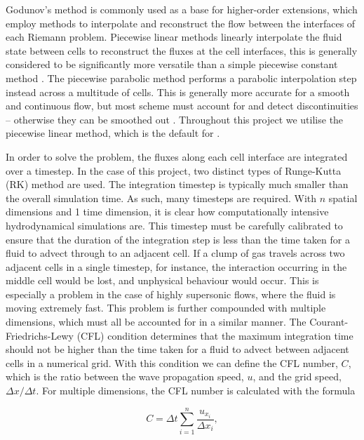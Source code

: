 Godunov's method is commonly used as a base for higher-order extensions, which employ methods to interpolate and reconstruct the flow between the interfaces of each Riemann problem.
Piecewise linear methods linearly interpolate the fluid state between cells to reconstruct the fluxes at the cell interfaces, this is generally considered to be significantly more versatile than a simple piecewise constant method \parencite{vanleerUltimateConservativeDifference1979}.
The piecewise parabolic method performs a parabolic interpolation step instead across a multitude of cells.
This is generally more accurate for a smooth and continuous flow, but most scheme must account for and detect discontinuities -- otherwise they can be smoothed out
\parencite{colella_piecewise_1984}.
Throughout this project we utilise the piecewise linear method, which is the default for \athena{}.

In order to solve the problem, the fluxes along each cell interface are integrated over a timestep.
In the case of this project, two distinct types of Runge-Kutta (RK) method are used.
The integration timestep is typically much smaller than the overall simulation time.
As such, many timesteps are required.
With $n$ spatial dimensions and 1 time dimension, it is clear how computationally intensive hydrodynamical simulations are.
This timestep must be carefully calibrated to ensure that the duration of the integration step is less than the time taken for a fluid to advect through to an adjacent cell.
If a clump of gas travels across two adjacent cells in a single timestep, for instance, the interaction occurring in the middle cell would be lost, and unphysical behaviour would occur.
This is especially a problem in the case of highly supersonic flows, where the fluid is moving extremely fast.
This problem is further compounded with multiple dimensions, which must all be accounted for in a similar manner.
The Courant-Friedrichs-Lewy (CFL) condition determines that the maximum integration time should not be higher than the time taken for a fluid to advect between adjacent cells in a numerical grid.
With this condition we can define the CFL number, $C$, which is the ratio between the wave propagation speed, $u$, and the grid speed, $\Delta x / \Delta t$.
For multiple dimensions, the CFL number is calculated with the formula

\begin{equation}
  \label{eq:cfl}
  C = \Delta t \sum^n_{i=1} \frac{u_{x_i}}{\Delta x_i} ,
\end{equation}

